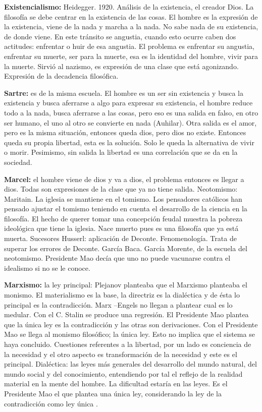 \documentclass[
  a4paper,
]{article}
\begin{document}
\textbf{Existencialismo:} Heidegger. 1920. Análisis de la existencia, el
creador Dios. La filosofía se debe centrar en la existencia de las
cosas. El hombre es la expresión de la existencia, viene de la nada y
marcha a la nada. No sabe nada de su existencia, de donde viene. En este
tránsito se angustia, cuando esto ocurre caben dos actitudes: enfrentar
o huir de esa angustia. El problema es enfrentar su angustia, enfrentar
su muerte, ser para la muerte, esa es la identidad del hombre, vivir
para la muerte. Sirvió al nazismo, es expresión de una clase que está
agonizando. Expresión de la decadencia filosófica.

\textbf{Sartre:} es de la misma escuela. El hombre es un ser sin
existencia y busca la existencia y busca aferrarse a algo para expresar
su existencia, el hombre reduce todo a la nada, busca aferrarse a las
cosas, pero eso es una salida en falso, en otro ser humano, el uno al
otro se convierte en nada (Auhilar). Otra salida es el amor, pero es la
misma situación, entonces queda dios, pero dios no existe. Entonces
queda su propia libertad, esta es la solución. Solo le queda la
alternativa de vivir o morir. Pesimismo, sin salida la libertad es una
correlación que se da en la sociedad.

\textbf{Marcel:} el hombre viene de dios y va a dios, el problema
entonces es llegar a dios. Todas son expresiones de la clase que ya no
tiene salida. Neotomismo: Maritain. La iglesia se mantiene en el
tomismo. Los pensadores católicos han pensado ajustar el tomismo
teniendo en cuenta el desarrollo de la ciencia en la filosofía. El hecho
de querer tomar una concepción feudal muestra la pobreza ideológica que
tiene la iglesia. Nace muerto pues es una filosofía que ya está muerta.
Sucesores Husserl: aplicación de Deconte. Fenomenología. Trata de
superar los errores de Deconte. García Baca. García Morente, de la
escuela del neotomismo. Presidente Mao decía que uno no puede vacunarse
contra el idealismo si no se le conoce.

\textbf{Marxismo:} la ley principal: Plejanov planteaba que el Marxismo
planteaba el monismo. El materialismo es la base, la directriz es la
dialéctica y de ésta lo principal es la contradicción. Marx --Engels no
llegan a plantear cual es lo medular. Con el C. Stalin se produce una
regresión. El Presidente Mao plantea que la única ley es la
contradicción y las otras son derivaciones. Con el Presidente Mao se
llega al monismo filosófico; la única ley. Esto no implica que el
sistema se haya concluido. Cuestiones referentes a la libertad, por un
lado es conciencia de la necesidad y el otro aspecto es transformación
de la necesidad y este es el principal. Dialéctica: las leyes más
generales del desarrollo del mundo natural, del mundo social y del
conocimiento, entendiendo por tal el reflejo de la realidad material en
la mente del hombre. La dificultad estaría en las leyes. Es el
Presidente Mao el que plantea una única ley, considerando la ley de la
contradicción como ley única .
\end{document}
